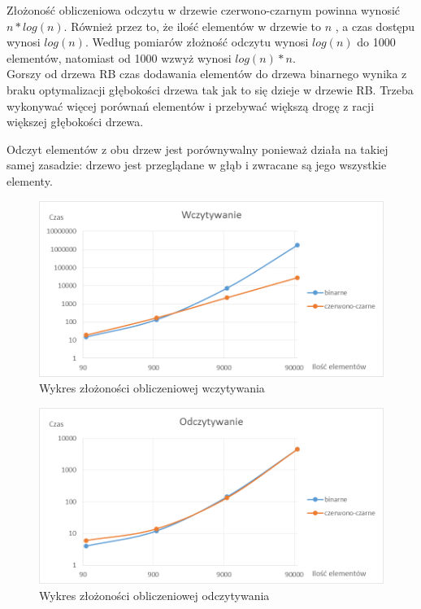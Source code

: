 \documentclass[a4paper,10pt]{scrartcl}
\begin{document}
Złożoność obliczeniowa odczytu w drzewie
czerwono-czarnym powinna wynosić
\begin{math}
 n*log(n).
\end{math}
Również przez to, że ilość elementów
w drzewie to
\begin{math}
 n
\end{math}
, a czas dostępu wynosi
\begin{math}
 log(n)
\end{math}.
Według pomiarów złożność odczytu wynosi
\begin{math}
 log(n)
\end{math}
do 1000 elementów, natomiast od 1000 wzwyż
wynosi
\begin{math}
 log(n) * n
\end{math}.
\\

Gorszy od drzewa RB czas dodawania elementów do 
drzewa binarnego wynika z braku optymalizacji
głębokości drzewa tak jak to się dzieje
w drzewie RB. Trzeba wykonywać więcej porównań
elementów i przebywać większą drogę z racji
większej głębokości drzewa.

Odczyt elementów z obu drzew jest porównywalny
ponieważ działa na takiej samej zasadzie: drzewo
jest przeglądane w głąb i zwracane są jego
wszystkie elementy.


\pagebreak

\begin{landscape}
\begin{figure}
 \centering
 \includegraphics{wczytywanie}
 \caption{Wykres złożoności obliczeniowej wczytywania}
\end{figure}

\begin{figure}
 \centering
 \includegraphics{odczytywanie}
 \caption{Wykres złożoności obliczeniowej odczytywania}
\end{figure}

\end{landscape}
\end{document}
